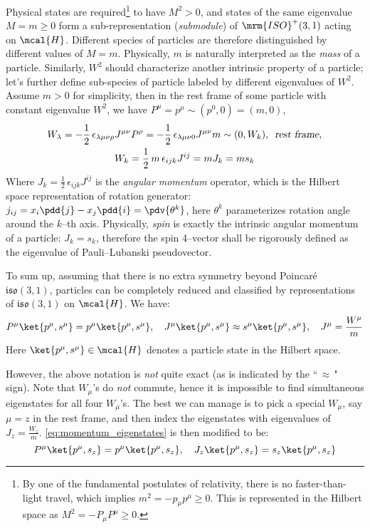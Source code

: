 \documentclass[a4paper,11pt]{article}
\begin{document}
	Physical states are required\footnote{
		By one of the fundamental postulates of relativity, there is no faster-than-light travel, which implies $m^2 = -p_\mu p^\mu \ge 0$. This is represented in the Hilbert space as $M^2 = -P_\mu P^\mu \ge 0$. 
	} to have $M^2 > 0$, and states of the same eigenvalue $M = m \ge 0$ form a sub-representation (\textit{submodule}) of $\mrm{ISO}^+(3,1)$ acting on $\mcal{H}$. Different species of particles are therefore distinguished by different values of $M = m$. Physically, $m$ is naturally interpreted as the \textit{mass} of a particle. Similarly, $W^2$ should characterize another intrinsic property of a particle; let's further define sub-species of particle labeled by different eigenvalues of $W^2$. Assume $m > 0$ for simplicity, then in the rest frame of some particle with constant eigenvalue $W^2$, we have $P^\mu = p^\mu \sim (p^0,0) = (m,0)$,
	\begin{gather}
		W_\lambda = - \frac{1}{2}\,
			\epsilon_{\lambda\mu\nu\rho}
			J^{\mu\nu} P^\rho
		= - \frac{1}{2}\,
			\epsilon_{\lambda\mu\nu 0}
			J^{\mu\nu} m
		\sim (0,W_k),\ \,\textsl{rest frame},\\
		W_k	= \frac{1}{2}\,m\,\epsilon_{ijk} J^{ij}
		= mJ_k = ms_k
	\end{gather}
	Where $J_k = \frac{1}{2}\,\epsilon_{ijk} J^{ij}$ is the \textit{angular momentum} operator, which is the Hilbert space representation of rotation generator: $
		j_{ij} = x_i\pdd{j} - x_j\pdd{i}
		= \pdv{\theta^k}
	$, here $\theta^k$ parameterizes rotation angle around the $k$--th axis. Physically, \textit{spin} is exactly the intrinsic angular momentum of a particle: $J_k = s_k$, therefore the spin 4--vector shall be rigorously defined as the eigenvalue of Pauli–Lubanski pseudovector. 
	
	To sum up, assuming that there is no extra symmetry beyond Poincar\'e $\mathfrak{iso}(3,1)$, particles can be completely reduced and classified by representations of $\mathfrak{iso}(3,1)$ on $\mcal{H}$. We have:
	\begin{equation}
		P^\mu{} \ket{p^\mu,s^\mu}
		= p^\mu \ket{p^\mu,s^\mu},\quad
		J^\mu \ket{p^\mu,s^\mu}
		\approx s^\mu \ket{p^\mu,s^\mu},\quad
		J^\mu = \frac{W^\mu}{m}
		\label{eq:momentum_eigenstates}
	\end{equation}
	Here $\ket{p^\mu,s^\mu}\in\mcal{H}$ denotes a particle state in the Hilbert space. 
	
	However, the above notation is \textit{not} quite exact (as is indicated by the ``\,$\approx$\," sign). Note that $W_\mu$'s do \textit{not} commute, hence it is impossible to find simultaneous eigenstates for all four $W_\mu$'s. The best we can manage is to pick a special $W_\mu$, say $\mu = z$ in the rest frame, and then index the eigenstates with eigenvalues of $J_z = \frac{W_z}{m}$. \eqref{eq:momentum_eigenstates} is then modified to be:
	\begin{equation}
		P^\mu{} \ket{p^\mu,s_z}
		= p^\mu \ket{p^\mu,s_z},\quad
		J_z \ket{p^\mu,s_z}
		= s_z \ket{p^\mu,s_z}
	\end{equation}
	
\end{document}
